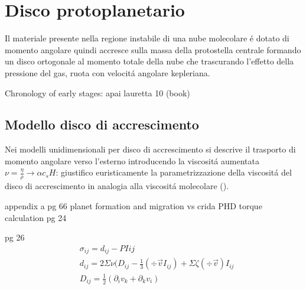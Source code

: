 {\let\clearpage\relax\let\cleardoublepage\relax
\chapter{Disco protoplanetario}
}


Il materiale presente nella regione instabile di una nube molecolare \'e dotato di momento angolare quindi accresce sulla massa della protostella centrale formando un disco ortogonale al momento totale della nube che trascurando l'effetto della pressione del gas, ruota con velocit\'a angolare kepleriana.

\begin{workout}
Chronology of  early stages: apai lauretta 10 (book)
\end{workout}

\vspace{0.2\textheight}

\section{Modello disco di accrescimento}

Nei modelli unidimensionali per disco di accrescimento si descrive il trasporto di momento angolare verso l'esterno introducendo la viscosit\'a aumentata $\nu=\frac{\eta}{\rho}\to\alpha c_s H$: giustifico euristicamente la parametrizzazione della viscosit\'a del disco di accrescimento in analogia alla viscosit\'a molecolare (\cite{bouvier2002theory}).

\begin{workout}
appendix a pg 66 planet formation and migration vs crida PHD torque calculation pg 24
\end{workout}
\begin{workout}
pg 26
\begin{align}
&\sigma_{ij}=d_{ij}-PI{ij}\\
&d_{ij}=2\Sigma\nu(D_{ij}-\frac{1}{3}(\div{\vec{v}}I_{ij})+\Sigma\zeta(\div{\vec{v}})I_{ij}\\
&D_{ij}=\frac{1}{2}(\partial_iv_k+\partial_kv_i)
\end{align}
\end{workout}

